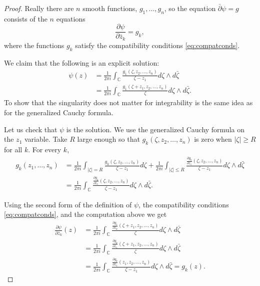 \documentclass[12pt,openany]{book}
\newcommand{\sabs}[1]{\lvert {#1} \rvert}
\newcommand{\abs}[1]{\left\lvert {#1} \right\rvert}
\newcommand{\C}{{\mathbb{C}}}
\theoremstyle{plain}
\theoremstyle{remark}
\theoremstyle{definition}
\theoremstyle{exercise}
\theoremstyle{example}
\begin{document}
\begin{proof}
Really there are $n$
smooth functions, $g_1,\ldots,g_n$, so the equation $\bar{\partial} \psi = g$
consists of the $n$ equations
\begin{equation*}
\frac{\partial \psi}{\partial \bar{z}_k} = g_k ,
\end{equation*}
where the functions $g_k$ satisfy the compatibility conditions
\eqref{eq:compatconds}.

We claim that the following is an explicit solution:
\begin{equation*}
\begin{split}
\psi(z)
& =
\frac{1}{2\pi i}
\int_\C
\frac{
 g_1(\zeta,z_2,\ldots,z_n)
}{\zeta - z_1}
d\zeta \wedge d\bar{\zeta}
\\
& =
\frac{1}{2\pi i}
\int_\C
\frac{
 g_1(\zeta+z_1,z_2,\ldots,z_n)
}{\zeta}
d\zeta \wedge d\bar{\zeta} .
\end{split}
\end{equation*}
To show that the singularity does not matter for integrability is the same
idea as for the generalized Cauchy formula.

Let us check that $\psi$ is the solution.
We use the generalized Cauchy formula on the $z_1$
variable.
Take $R$ large enough so that
$g_k(\zeta,z_2,\ldots,z_n)$ is zero when $\sabs{\zeta}\geq R$ for all $k$.
For every $k$,
\begin{equation*}
\begin{split}
g_k(z_1,\ldots,z_n) & =
\frac{1}{2\pi i}
\int_{\abs{\zeta}=R}
\frac{g_k(\zeta,z_2,\ldots,z_n)}{\zeta-z_1}
d \zeta
+
\frac{1}{2\pi i}
\int_{\abs{\zeta} \leq R}
\frac{\frac{\partial g_k}{\partial \bar{z}_1}(\zeta,z_2,\ldots,z_n)}{\zeta-z_1}
d\zeta \wedge d\bar{\zeta}
\\
& =
\frac{1}{2\pi i}
\int_{\C}
\frac{\frac{\partial g_k}{\partial \bar{z}_1}(\zeta,z_2,\ldots,z_n)}{\zeta-z_1}
d\zeta \wedge d\bar{\zeta}  .
\end{split}
\end{equation*}

Using the second form of the definition of $\psi$, the
compatibility conditions \eqref{eq:compatconds}, and the computation above we get
\begin{equation*}
\begin{split}
\frac{\partial\psi}{\partial \bar{z}_k}(z)
& =
\frac{1}{2\pi i}
\int_\C
\frac{
 \frac{\partial g_1}{\partial \bar{z}_k}(\zeta+z_1,z_2,\ldots,z_n)
}{\zeta}
d\zeta \wedge d\bar{\zeta}
\\
& =
\frac{1}{2\pi i}
\int_\C
\frac{
 \frac{\partial g_k}{\partial \bar{z}_1}(\zeta+z_1,z_2,\ldots,z_n)
}{\zeta}
d\zeta \wedge d\bar{\zeta}
\\
& =
\frac{1}{2\pi i}
\int_\C
\frac{
 \frac{\partial g_k}{\partial \bar{z}_1}(z_1,z_2,\ldots,z_n)
}{\zeta-z_1}
d\zeta \wedge d\bar{\zeta}
=
g_k(z) .
\end{split}
\end{equation*}


\end{proof}
\end{document}
